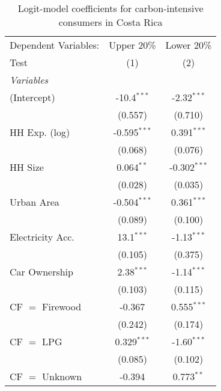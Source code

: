 
\begin{table}[htbp!]
   \centering
   \small
   \begin{adjustbox}{width = 1\textwidth, max height = 0.95\textheight, center}
      \begin{threeparttable}[b]
         \caption{\label{tab:Logit_1_CRI} Logit-model coefficients for carbon-intensive consumers in Costa Rica}
         \begin{tabular}{lcc}
            \tabularnewline \midrule \midrule
            Dependent Variables: & Upper 20\%     & Lower 20\%\\   
            Test                 & (1)            & (2)\\  
            \midrule
            \emph{Variables}\\
            (Intercept)          & -10.4$^{***}$  & -2.32$^{***}$\\   
                                 & (0.557)        & (0.710)\\   
            HH Exp. (log)        & -0.595$^{***}$ & 0.391$^{***}$\\   
                                 & (0.068)        & (0.076)\\   
            HH Size              & 0.064$^{**}$   & -0.302$^{***}$\\   
                                 & (0.028)        & (0.035)\\   
            Urban Area           & -0.504$^{***}$ & 0.361$^{***}$\\   
                                 & (0.089)        & (0.100)\\   
            Electricity Acc.     & 13.1$^{***}$   & -1.13$^{***}$\\   
                                 & (0.105)        & (0.375)\\   
            Car Ownership        & 2.38$^{***}$   & -1.14$^{***}$\\   
                                 & (0.103)        & (0.115)\\   
            CF $=$ Firewood      & -0.367         & 0.555$^{***}$\\   
                                 & (0.242)        & (0.174)\\   
            CF $=$ LPG           & 0.329$^{***}$  & -1.60$^{***}$\\   
                                 & (0.085)        & (0.102)\\   
            CF $=$ Unknown       & -0.394         & 0.773$^{**}$\\   

\end{tabular}
\end{threeparttable}
\end{adjustbox}
\end{table}
